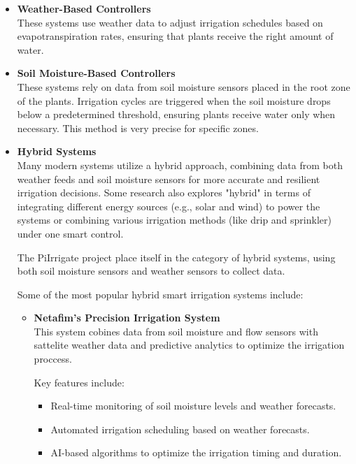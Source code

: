 \begin{itemize}
  \item \textbf{Weather-Based Controllers} \\
  These systems use weather data to adjust irrigation schedules based on evapotranspiration rates, 
  ensuring that plants receive the right amount of water.

  \item \textbf{Soil Moisture-Based Controllers} \\
  These systems rely on data from soil moisture sensors placed in the root zone of the plants.
  Irrigation cycles are triggered when the soil moisture drops below a predetermined threshold, 
  ensuring plants receive water only when necessary.
  This method is very precise for specific zones\cite{smartIrrigationTechnologyControllersAndSensors}.

  \item \textbf{Hybrid Systems} \\
  Many modern systems utilize a hybrid approach, combining data from both
  weather feeds and soil moisture sensors for more accurate and resilient 
  irrigation decisions. Some research also explores "hybrid" in terms of 
  integrating different energy sources (e.g., solar and wind) to power the systems or 
  combining various 
  irrigation methods (like drip and sprinkler) under one smart control\cite{soilBasedIrrigation}.

  The PiIrrigate project place itself in the category of hybrid systems, using both
  soil moisture sensors and weather sensors to collect data.
  
  Some of the most popular hybrid smart irrigation systems include:
  \begin{itemize}
    \item \textbf{Netafim's Precision Irrigation System} \\
    This system cobines data from soil moisture and flow sensors with sattelite weather data and predictive
    analytics to optimize the irrigation proccess.
    
    Key features include:
    \begin{itemize}
      \item Real-time monitoring of soil moisture levels and weather forecasts.
      \item Automated irrigation scheduling based on weather forecasts.
      \item AI-based algorithms to optimize the irrigation timing and duration.
    \end{itemize}


\end{itemize}
\end{itemize}
